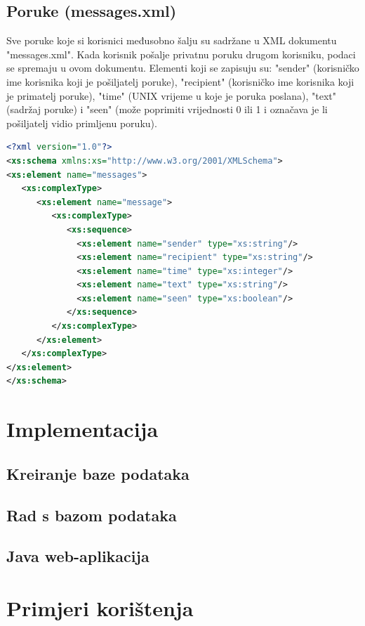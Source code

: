 \documentclass{foi}
\begin{document}
\section{Poruke (messages.xml)}

Sve poruke koje si korisnici međusobno šalju su sadržane u XML dokumentu "messages.xml". Kada korisnik pošalje privatnu poruku drugom korisniku, podaci se spremaju u ovom dokumentu. Elementi koji se zapisuju su: "sender" (korisničko ime korisnika koji je pošiljatelj poruke), "recipient" (korisničko ime korisnika koji je primatelj poruke), "time" (UNIX vrijeme u koje je poruka poslana), "text" (sadržaj poruke) i "seen" (može poprimiti vrijednosti 0 ili 1 i označava je li pošiljatelj vidio primljenu poruku).

\begin{lstlisting}[language=XML]
 <?xml version="1.0"?>
<xs:schema xmlns:xs="http://www.w3.org/2001/XMLSchema">
<xs:element name="messages">
   <xs:complexType>
      <xs:element name="message">
         <xs:complexType>
            <xs:sequence>
              <xs:element name="sender" type="xs:string"/>
              <xs:element name="recipient" type="xs:string"/>
              <xs:element name="time" type="xs:integer"/>
              <xs:element name="text" type="xs:string"/>
              <xs:element name="seen" type="xs:boolean"/>
            </xs:sequence>
         </xs:complexType>
      </xs:element>
   </xs:complexType>
</xs:element>
</xs:schema> 
\end{lstlisting}

\chapter{Implementacija}

\section{Kreiranje baze podataka}
\section{Rad s bazom podataka}
\section{Java web-aplikacija}

\chapter{Primjeri korištenja}
\end{document}
